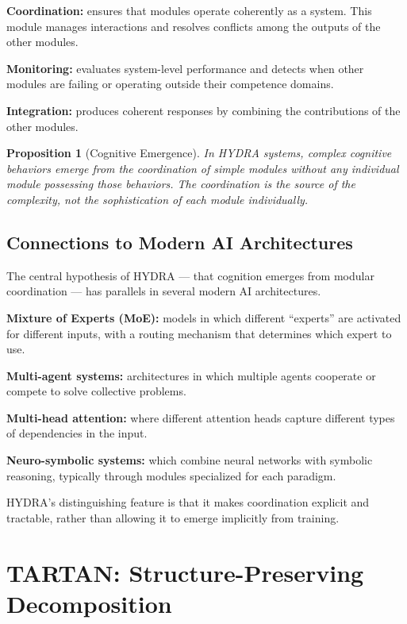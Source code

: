 \documentclass[11pt, a4paper]{article}
\theoremstyle{named}
\newtheorem{proposition}{Proposition}
\begin{document}
\textbf{Coordination:} ensures that modules operate coherently as a
system. This module manages interactions and resolves conflicts among
the outputs of the other modules.

\textbf{Monitoring:} evaluates system-level performance and detects
when other modules are failing or operating outside their competence
domains.

\textbf{Integration:} produces coherent responses by combining the
contributions of the other modules.

\begin{proposition}[Cognitive Emergence]
In HYDRA systems, complex cognitive behaviors emerge from the
coordination of simple modules without any individual module
possessing those behaviors. The coordination is the source of the
complexity, not the sophistication of each module individually.
\end{proposition}

\subsection{Connections to Modern AI Architectures}

The central hypothesis of HYDRA --- that cognition emerges from
modular coordination --- has parallels in several modern AI
architectures.

\textbf{Mixture of Experts (MoE):} models in which different
``experts'' are activated for different inputs, with a routing
mechanism that determines which expert to use.

\textbf{Multi-agent systems:} architectures in which multiple agents
cooperate or compete to solve collective problems.

\textbf{Multi-head attention:} where different attention heads capture
different types of dependencies in the input.

\textbf{Neuro-symbolic systems:} which combine neural networks with
symbolic reasoning, typically through modules specialized for each
paradigm.

HYDRA's distinguishing feature is that it makes coordination explicit
and tractable, rather than allowing it to emerge implicitly from
training.

\section{TARTAN: Structure-Preserving Decomposition}
\end{document}

